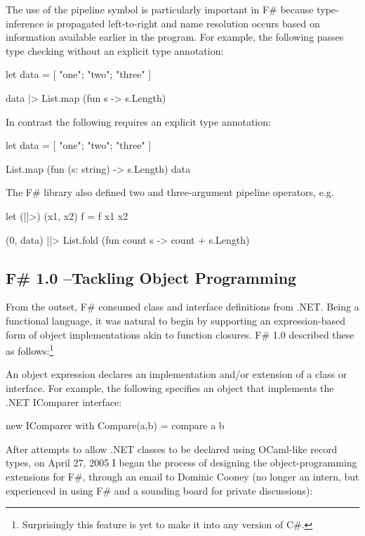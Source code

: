 \documentclass[acmsmall,review]{acmart}\settopmatter{printfolios=true,printccs=false,printacmref=false}
\begin{document}
The use of the pipeline symbol is particularly important in F\# because type-inference is propagated left-to-right and name resolution occurs based on information available earlier in the program.  For example, the following passes type checking without an explicit type annotation:
\begin{verbquote}
let data = [ "one"; "two"; "three" ] 

data |> List.map (fun s -> s.Length)
\end{verbquote}
In contrast the following requires an explicit type annotation:
\begin{verbquote}
let data = [ "one"; "two"; "three" ] 

List.map (fun (s: string) -> s.Length) data
\end{verbquote}
The F\# library also defined two and three-argument pipeline operators, e.g.
\begin{verbquote}
let (||>) (x1, x2) f = f x1 x2

(0, data) 
    ||> List.fold (fun count s -> count + s.Length)
\end{verbquote}

\subsection*{F\# 1.0 –Tackling Object Programming}

From the outset, F\# consumed class and interface definitions from .NET. Being a functional language, it was natural to begin by supporting an expression-based form of object implementations akin to function closures.  F\# 1.0 described these as follows:\footnote{Surprisingly this feature is yet to make it into any version of C\#.}
\begin{verbquote}
An object expression declares an implementation and/or extension of a class or interface. For example, the following specifies an object that implements the .NET IComparer interface:
\end{verbquote}
\begin{verb}
    { new IComparer with Compare(a,b) = compare a b }
\end{verb}

After attempts to allow .NET classes to be declared using OCaml-like record types, on April 27, 2005 I began the process of designing the object-programming extensions for F\#, through an email to Dominic Cooney (no longer an intern, but experienced in using F\# and a sounding board for private discussions):
\end{document}
